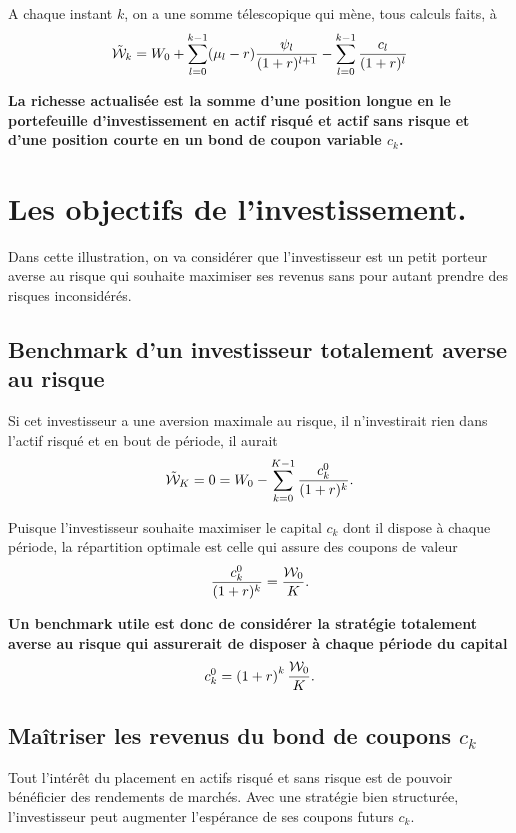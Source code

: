 \documentclass{article}
\numberwithin{equation}{section}
\begin{document}
A chaque instant $k$, on a une somme télescopique qui mène, tous calculs faits, à
\begin{equation}
\tilde{\mathcal{W}}_k =  W_0 + \sum_{l=0}^{k - 1}(\mu_l - r) \frac{\psi_l}{(1 + r)^{l+1}} - \sum_{l=0}^{k - 1} \frac{c_l}{(1 + r)^l}
\end{equation}

\textbf{\color{awesomePurple}La richesse actualisée est la somme d'une position longue en le portefeuille d'investissement en actif risqué et actif sans risque et d'une position courte en un bond de coupon variable $c_k$.}


\section{Les objectifs de l'investissement.}

Dans cette illustration, on va considérer que l'investisseur est un petit porteur averse au risque qui souhaite maximiser ses revenus sans pour autant prendre des risques inconsidérés.\\

\subsection{Benchmark d'un investisseur totalement averse au risque}

Si cet investisseur a une aversion maximale au risque, il n'investirait rien dans l'actif risqué et en bout de période, il aurait
$$
\tilde{\mathcal{W}}_K = 0 = W_0 - \sum_{k=0}^{K - 1} \frac{c^0_k}{(1 + r)^k}.\\
$$

Puisque l'investisseur souhaite maximiser le capital $c_k$ dont il dispose à chaque période, la répartition optimale est celle qui assure des coupons de valeur
$$
\frac{c^0_k}{(1 + r)^k} = \frac{\mathcal{W}_0}{K}.
$$

\textbf{\color{awesomePurple}Un benchmark utile est donc de considérer la stratégie totalement averse au risque qui assurerait de disposer à chaque période du capital
\begin{equation}
c_k^0 = \left( 1 + r \right)^k\frac{\mathcal{W}_0}{K}.
\end{equation}}

\subsection{Maîtriser les revenus du bond de coupons $c_k$}

Tout l'intérêt du placement en actifs risqué et sans risque est de pouvoir bénéficier des rendements de marchés. Avec une stratégie  bien structurée, l'investisseur peut augmenter l'espérance de ses coupons futurs $c_k$.\\ 
\end{document}
